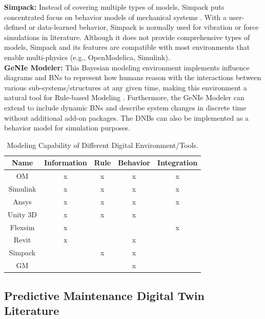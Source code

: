 \documentclass[runningheads]{llncs}
\begin{document}
\textbf{Simpack:} Instead of covering multiple types of models, Simpack puts concentrated focus on behavior models of mechanical systems \cite{moghadam2021digital}. With a user-defined or data-learned behavior, Simpack is normally used for vibration or force simulations in literature. Although it does not provide comprehensive types of models, Simpack and its features are compatible with most environments that enable multi-physics (e.g., OpenModelica, Simulink).\\

\textbf{GeNIe Modeler:} This Bayesian modeling environment implements influence diagrams and BNs to represent how humans reason with the interactions between various sub-systems/structures at any given time, making this environment a natural tool for Rule-based Modeling \cite{meng2022data}. Furthermore, the GeNIe Modeler can extend to include dynamic BNs and describe system changes in discrete time without additional add-on packages. The DNBs can also be implemented as a behavior model for simulation purposes.\\


\begin{table}[htbp]
\caption{Modeling Capability of Different Digital Environment/Tools.}
\begin{center}
\begin{tabular}{c|cccc}
\hline
        \textbf{Name} & \textbf{Information} & \textbf{Rule} & \textbf{Behavior} & \textbf{Integration}\\
        \hline
        OM & x & x & x & x\\ \hline
        Simulink & x & x & x & x\\\hline
        Ansys & x & x & x & x\\\hline
        Unity 3D & x & x & x & \\\hline
        Flexsim & x &  &  & x \\\hline
        Revit & x & & x & \\\hline
        Simpack & & x & x & \\\hline
        GM & & & x & \\\hline
\end{tabular}
\label{DEcapa}
\end{center}
\end{table}
\subsection{Predictive Maintenance Digital Twin Literature} \label{sec:DTLit}
\end{document}
